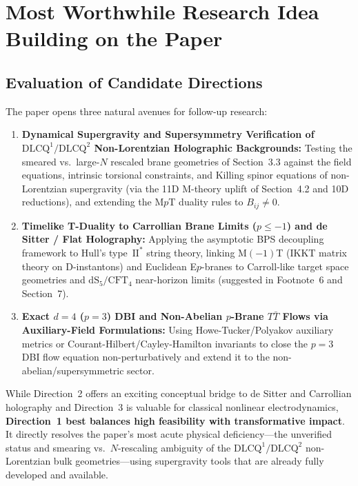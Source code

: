 \documentclass[11pt,a4paper]{article}
\begin{document}
\section{Most Worthwhile Research Idea Building on the Paper}

\subsection*{Evaluation of Candidate Directions}
The paper opens three natural avenues for follow-up research:
\begin{enumerate}[label=\textbf{\arabic*.}, leftmargin=1.8em]
    \item \textbf{Dynamical Supergravity and Supersymmetry Verification of $\text{DLCQ}^1/\text{DLCQ}^2$ Non-Lorentzian Holographic Backgrounds:} Testing the smeared vs.\ large-$N$ rescaled brane geometries of Section~3.3 against the field equations, intrinsic torsional constraints, and Killing spinor equations of non-Lorentzian supergravity (via the 11D M-theory uplift of Section~4.2 and 10D reductions), and extending the M$p$T duality rules to $B_{ij} \neq 0$.
    \item \textbf{Timelike T-Duality to Carrollian Brane Limits ($p \le -1$) and de Sitter / Flat Holography:} Applying the asymptotic BPS decoupling framework to Hull's type~$\text{II}^*$ string theory, linking M$(-1)$T (IKKT matrix theory on D-instantons) and Euclidean E$p$-branes to Carroll-like target space geometries and $\text{dS}_5/\text{CFT}_4$ near-horizon limits (suggested in Footnote~6 and Section~7).
    \item \textbf{Exact $d=4$ ($p=3$) DBI and Non-Abelian $p$-Brane $T\bar{T}$ Flows via Auxiliary-Field Formulations:} Using Howe-Tucker/Polyakov auxiliary metrics or Courant-Hilbert/Cayley-Hamilton invariants to close the $p=3$ DBI flow equation non-perturbatively and extend it to the non-abelian/supersymmetric sector.
\end{enumerate}

While Direction~2 offers an exciting conceptual bridge to de Sitter and Carrollian holography and Direction~3 is valuable for classical nonlinear electrodynamics, \textbf{Direction~1 best balances high feasibility with transformative impact}. It directly resolves the paper's most acute physical deficiency---the unverified status and smearing vs.\ $N$-rescaling ambiguity of the $\text{DLCQ}^1/\text{DLCQ}^2$ non-Lorentzian bulk geometries---using supergravity tools that are already fully developed and available.
\end{document}

